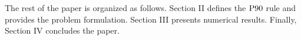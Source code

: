 \documentclass[conference]{IEEEtran}
\begin{document}



The rest of the paper is organized as follows. Section II defines the $\rm{P90}$ rule and provides the problem formulation. Section III presents numerical results. Finally, Section IV concludes the paper. 


\vspace{2mm}
\end{document}
